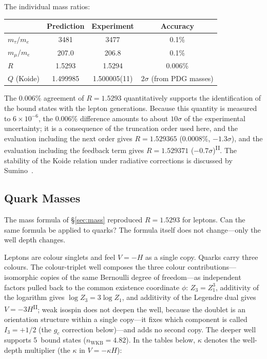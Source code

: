 \documentclass[12pt,a4paper]{article}
\newcommand{\PII}{\textsuperscript{\textup{II}}}
\begin{document}
\noindent
The individual mass ratios:
\begin{center}\small
\begin{tabular}{lccc}
\toprule
 & Prediction & Experiment & Accuracy \\
\midrule
$m_\tau/m_e$ & 3481 & 3477 & 0.1\% \\
$m_\mu/m_e$ & 207.0 & 206.8 & 0.1\% \\
$R$          & 1.5293 & 1.5294 & 0.006\% \\
$Q$ (Koide)  & 1.499985 & 1.500005(11) & $2\sigma$ (from PDG masses) \\
\bottomrule
\end{tabular}
\end{center}

The $0.006\%$ agreement of $R = 1.5293$ quantitatively supports the identification of the bound states with the lepton generations. Because this quantity is measured to $6 \times 10^{-6}$, the $0.006\%$ difference amounts to about $10\sigma$ of the experimental uncertainty; it is a consequence of the truncation order used here, and the evaluation including the next order gives $R = 1.529365$ ($0.0008\%$, $-1.3\sigma$), and the evaluation including the feedback term gives $R = 1.529371$ ($-0.7\sigma$)\PII{}. The stability of the Koide relation under radiative corrections is discussed by Sumino~\cite{sumino}.


\subsection{Quark Masses}\label{sec:quarks}

The mass formula of \S\ref{sec:mass} reproduced $R = 1.5293$ for leptons.
Can the same formula be applied to quarks?
The formula itself does not change---only the well depth changes.

Leptons are colour singlets and feel $V = -H$ as a single copy.
Quarks carry three colours. The colour-triplet well composes the three colour contributions---isomorphic copies of the same Bernoulli degree of freedom---as independent factors pulled back to the common existence coordinate $\phi$: $Z_3 = Z_1^3$, additivity of the logarithm gives $\log Z_3 = 3\log Z_1$, and additivity of the Legendre dual gives $V = -3H$\PII{}; weak
isospin does not deepen the well, because the doublet is an orientation structure
within a single copy---it fixes which component is called
$I_3 = +1/2$ (the $g_c$ correction below)---and adds no second
copy.
The deeper well supports 5~bound states ($n_\mathrm{WKB} = 4.82$). In the tables below,
$\kappa$ denotes the well-depth multiplier (the $\kappa$ in $V = -\kappa H$):
\end{document}
